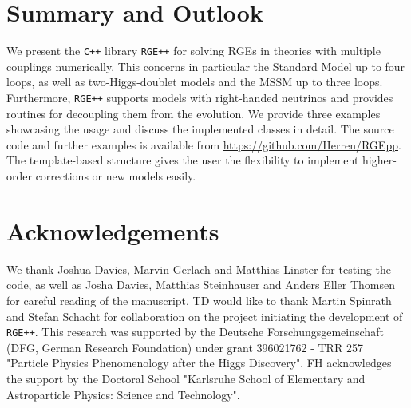 \documentclass[preprint,12pt]{elsarticle}
\begin{document}
\section{\label{sec::sum}Summary and Outlook}
We present the \texttt{C++} library \texttt{RGE++} for solving RGEs in theories with multiple couplings numerically. This concerns in particular the Standard Model up to four loops, as well as
two-Higgs-doublet models and the MSSM up to three loops. Furthermore, \texttt{RGE++} supports models with right-handed neutrinos and provides routines for decoupling them from the evolution.
We provide three examples showcasing the usage and discuss the implemented classes in detail. The source code and further examples is available from \url{https://github.com/Herren/RGEpp}.
The template-based structure gives the user the flexibility to implement higher-order corrections or new models easily.

\section*{Acknowledgements}
We thank Joshua Davies, Marvin Gerlach and Matthias Linster for testing the code, as well as Josha Davies, Matthias Steinhauser and Anders Eller Thomsen for careful reading of the manuscript.
TD would like to thank Martin Spinrath and Stefan Schacht for collaboration on the project initiating the development of \texttt{RGE++}.
This research was supported by the Deutsche Forschungsgemeinschaft (DFG, German Research Foundation) under grant 396021762 - TRR 257 "Particle Physics Phenomenology after the Higgs Discovery".
FH acknowledges the support by the Doctoral School "Karlsruhe School of Elementary and Astroparticle Physics: Science and Technology".


\end{document}
